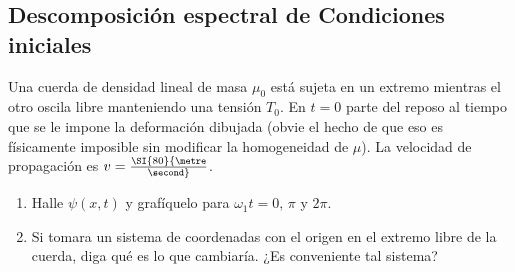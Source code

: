 \subsection*{Descomposición espectral de Condiciones iniciales}

\item
\begin{minipage}[t][2.3cm]{0.6\textwidth}
Una cuerda de densidad lineal de masa $\mu_{0}$ está sujeta en un extremo mientras el otro oscila libre manteniendo una tensión $T_{0}$.
En $t = 0$ parte del reposo al tiempo que se le impone la deformación dibujada (obvie el hecho de que eso es físicamente imposible sin modificar la homogeneidad de $\mu$).
La velocidad de propagación es \(v = \SI{80}{\metre\over\second} \).
\end{minipage}
\begin{minipage}[c][0.4cm][t]{0.34\textwidth}
\end{minipage}
\begin{enumerate}
	\item Halle $\psi(x,t)$ y grafíquelo para $\omega_1 t = 0,\,\pi$ y $2\pi$.
	\item Si tomara un sistema de coordenadas con el origen en el extremo libre de la cuerda, diga qué es lo que cambiaría.
	¿Es conveniente tal sistema?
\end{enumerate}





